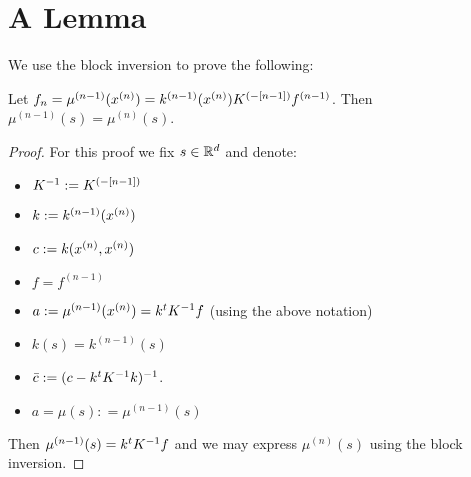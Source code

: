 \section{A Lemma}
We use the block inversion to prove the following:
\begin{lemma}
Let $f_n = \mu^{(n-1)}(x^{(n)}) =  k^{(n-1)}(x^{(n)})K^{(-[n-1])}f^{(n-1)}$. Then $\mu^{(n-1)}(s) = \mu^{(n)}(s)$.
\end{lemma}
\begin{proof}
 For this proof we fix $s\in \mathbb{R} ^{d}$ and denote:
\begin{itemize}
 \item $K^{-1} := K^{(-[n-1])}$ 
 \item $k : = k^{(n-1)}(x^{(n)})$
 \item $c := k(x^{(n)},x^{(n)})$
 \item $f = f^{(n-1)}$ 
 \item $a : = \mu^{(n-1)}(x^{(n)}) = k^tK^{-1} f$ (using the above notation)
 \item $k(s) = k^{(n-1)}(s)$
 \item $\bar{c} := (c - k^tK^{-1} k)^{-1}$. 
 \item $a = \mu(s) : = \mu^{(n-1)}(s)$
\end{itemize}
Then $\mu^{(n-1)}(s) = k^tK^{-1} f$ and we may express $\mu^{(n)}(s)$ using the block inversion.



\end{proof}
